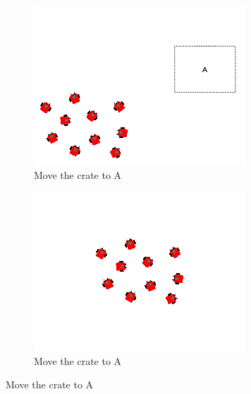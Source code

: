 \documentclass[]{article}
\begin{document}
	
\begin{figure}
	\ContinuedFloat
	\centering	
	\begin{subfigure}{0.42\textwidth}
		\centering
		\includegraphics[width=\linewidth]{slide_images/Swarm_Robot_Control_-_10_Robot_0035.png}
		\caption{Move the crate to A}
		\label{fig:sub1}
	\end{subfigure}%
	\begin{subfigure}{0.42\textwidth}
		\centering
		\includegraphics[width=\linewidth]{slide_images/Swarm_Robot_Control_-_10_Robot_0037.png}
		\caption{Move the crate to A}
		\label{fig:sub2}
	\end{subfigure}
	\label{fig:10_robot_slides}
\end{figure}
\end{document}
